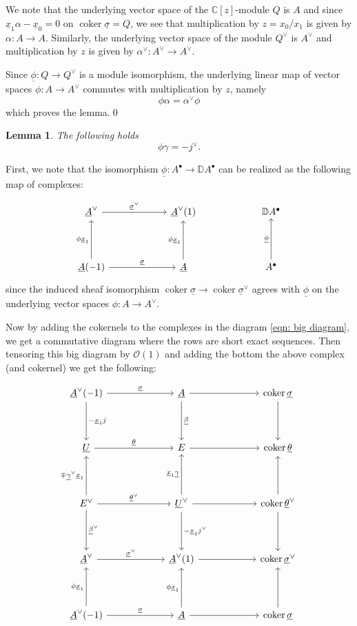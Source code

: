 \documentclass{amsart}
\newtheorem{lemma}[theorem]{Lemma}
\theoremstyle{definition}
\newcommand{\CC} {{\mathbb C}}          %
\newcommand{\DD} {{\mathbb D}}
\newcommand{\OO}{\mathcal{O}}
\newcommand{\coker}{\operatorname{coker}}
\newcommand{\UL}[1]{\underline{#1}}
\begin{document}
We note that the underlying vector space of the $\CC [z]$-module $Q$ is
$A$ and since $\UL{x}_{1}\alpha -\UL{x}_{0}=0$ on $\coker
\UL{\sigma}=Q$, we see that multiplication by $z=x_{0}/x_{1}$ is given
by $\alpha :A\to A$. Similarly, the underlying vector space of the
module $Q^{\vee}$ is $A^{\vee}$ and multiplication by $z$ is given by
$\alpha^{\vee}:A^{\vee}\to A^{\vee}$.

Since $\UL{\phi}:Q\to Q^{\vee}$ is a module isomorphism, the
underlying linear map of vector spaces $\phi :A\to A^{\vee}$ commutes
with multiplication by $z$, namely
\[
\phi \alpha =\alpha^{\vee}\phi 
\]
which proves the lemma.\qed 

\begin{lemma}\label{lem: phi.gamma = -jvee}
The following holds
\[
\phi \gamma =-j^{\vee}.
\]
\end{lemma}
\proof
First, we note that the isomorphism $\UL{\phi}:A^{\bullet}\to \DD
A^{\bullet}$ can be realized as the following map of complexes:

\[
\begin{tikzcd}[column sep=6em,row sep=4em]
  \UL{A}^{\vee }
    \arrow[r,"\UL{\sigma}^{\vee}"]
  & \UL{A}^{\vee}(1)
  & \DD A^{\bullet }
  \\
  \UL{A}(-1)
    \arrow[r,"\UL{\sigma  }"]
    \arrow[u,"\phi \UL{x}_{1}"]
  & \UL{A}
    \arrow[u,"\phi \UL{x}_{1}"]
  & A^{\bullet}
    \arrow[u,"\UL{\phi } "]
\end{tikzcd}
\]
since the induced sheaf isomorphism $\coker \UL{\sigma}\to \coker
\UL{\sigma}^{\vee}$ agrees with $\UL{\phi}$ on the underlying vector
spaces $\phi :A\to A^{\vee}$.

Now by adding the cokernels to the complexes in the diagram
\eqref{eqn: big diagram}, we get a commutative diagram where the rows
are short exact sequences. Then tensoring this big diagram by $\OO
(1)$ and adding the bottom the above complex (and cokernel) we get the
following:

\begin{equation*}
\begin{tikzcd}[column sep=6em,row sep=4em]
  \UL{A}^{\vee }(-1)
    \arrow[d,"-\UL{x}_{1}j"]
    \arrow[r,"\UL{\sigma  }"]
  & \UL{A}
    \arrow[d,"\UL{\beta }"]
    \arrow[r]
  & \coker \UL{\sigma }
    \arrow[d]
  \\
  \UL{U}
    \arrow[r,"\UL{\theta }"]
  & E
    \arrow[r]
  & \coker \UL{\theta }
  \\
  E^{\vee}
    \arrow[d,"\UL{\beta}^{\vee}"]
    \arrow[u,"\mp \UL{\gamma}^{\vee}\UL{x}_{1}"]
    \arrow[r,"\UL{\theta }^{\vee}"]
  & \UL{U}^{\vee }
    \arrow[r]
    \arrow[d,"-\UL{x}_{1}j^{\vee}"]
    \arrow[u,"\UL{x}_{1}\UL{\gamma }"]
  & \coker \UL{\theta}^{\vee}
    \arrow[d]
    \arrow[u]
  \\
    \UL{A}^{\vee} 
    \arrow[r,"\UL{\sigma  }^{\vee}"]
  & \UL{A}^{\vee}(1)
    \arrow[r]
  & \coker \UL{\sigma}^{\vee}
  \\
  \UL{A}^{\vee }(-1)
    \arrow[u,"\phi \UL{x}_{1}"]
    \arrow[r,"\UL{\sigma  }"]
  & \UL{A}
    \arrow[u,"\phi \UL{x}_{1}"]
    \arrow[r]
  & \coker \UL{\sigma }
    \arrow[u]    
\end{tikzcd}
\end{equation*}
\end{document}
